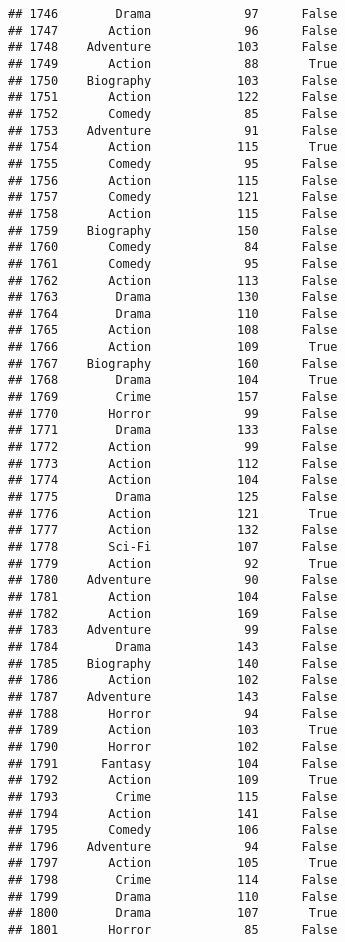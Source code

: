 \documentclass[
]{article}
\begin{document}
\begin{verbatim}
## 1746        Drama             97      False
## 1747       Action             96      False
## 1748    Adventure            103      False
## 1749       Action             88       True
## 1750    Biography            103      False
## 1751       Action            122      False
## 1752       Comedy             85      False
## 1753    Adventure             91      False
## 1754       Action            115       True
## 1755       Comedy             95      False
## 1756       Action            115      False
## 1757       Comedy            121      False
## 1758       Action            115      False
## 1759    Biography            150      False
## 1760       Comedy             84      False
## 1761       Comedy             95      False
## 1762       Action            113      False
## 1763        Drama            130      False
## 1764        Drama            110      False
## 1765       Action            108      False
## 1766       Action            109       True
## 1767    Biography            160      False
## 1768        Drama            104       True
## 1769        Crime            157      False
## 1770       Horror             99      False
## 1771        Drama            133      False
## 1772       Action             99      False
## 1773       Action            112      False
## 1774       Action            104      False
## 1775        Drama            125      False
## 1776       Action            121       True
## 1777       Action            132      False
## 1778       Sci-Fi            107      False
## 1779       Action             92       True
## 1780    Adventure             90      False
## 1781       Action            104      False
## 1782       Action            169      False
## 1783    Adventure             99      False
## 1784        Drama            143      False
## 1785    Biography            140      False
## 1786       Action            102      False
## 1787    Adventure            143      False
## 1788       Horror             94      False
## 1789       Action            103       True
## 1790       Horror            102      False
## 1791      Fantasy            104      False
## 1792       Action            109       True
## 1793        Crime            115      False
## 1794       Action            141      False
## 1795       Comedy            106      False
## 1796    Adventure             94      False
## 1797       Action            105       True
## 1798        Crime            114      False
## 1799        Drama            110      False
## 1800        Drama            107       True
## 1801       Horror             85      False

\end{verbatim}
\end{document}
